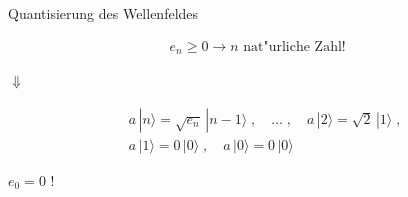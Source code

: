 \documentclass{beamer}
\begin{document}
\begin{frame}[t]{Quantisierung des Wellenfeldes}
	\vspace*{-0.5cm}
	\begin{center}
		\begin{minipage}{0.35\textwidth}
			\begin{align*}
			e_n \geq 0 \rightarrow n \text{ nat"urliche Zahl! }
			\end{align*}
		\end{minipage}
		
		\vspace*{0.5cm}
		$\Downarrow$
		
		\begin{minipage}{0.35\textwidth}
			\begin{align*}
			& a\,|n\rangle = \sqrt{e_n}\,|n-1\rangle  \;, \quad \hdots \; , \quad a\,|2\rangle = \sqrt{2}\,|1\rangle \; , \\
			 & a\,|1\rangle = 0\,|0\rangle \;, \quad a\,|0\rangle = 0\,|0\rangle
			\end{align*}
			
			\vspace*{0.5cm}
			
			$e_0 = 0$ !
		\end{minipage}
	\end{center}
\end{frame}

\end{document}
